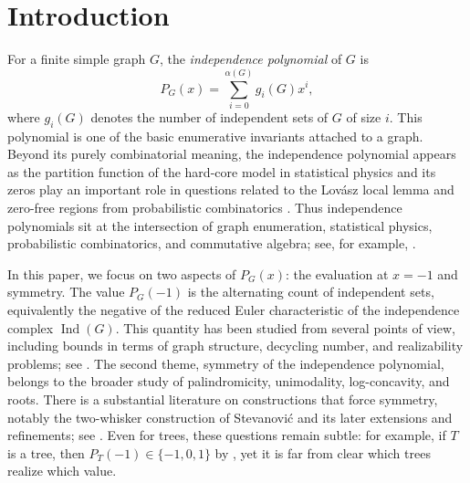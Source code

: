 \documentclass[12pt]{amsart}
\theoremstyle{plain}
\theoremstyle{definition}
\DeclareMathOperator{\Ind}{Ind}
\begin{document}
\maketitle




\section*{Introduction}

For a finite simple graph \(G\), the \emph{independence polynomial} of \(G\) is
\[
P_G(x)=\sum_{i=0}^{\alpha(G)} g_i(G)x^i,
\]
where \(g_i(G)\) denotes the number of independent sets of \(G\) of size \(i\).
This polynomial is one of the basic enumerative invariants attached to a graph.  Beyond its purely combinatorial meaning, the independence polynomial appears as the partition function of the hard-core model in statistical physics \cite{hardcore_model} and
its zeros play an important role in questions
related to the Lov\'asz local lemma and zero-free regions from probabilistic combinatorics \cite{ScottSokal2005}. Thus independence
polynomials sit at the intersection of graph enumeration, statistical physics,
probabilistic combinatorics, and commutative algebra; see, for example,
\cite{Survey_ind_poly,GutmanHarary,biermann2026,hibi2026pseudogorensteingraphs}.

In this paper, we focus on two aspects of \(P_G(x)\): the evaluation at \(x=-1\) and
symmetry.  The value  $P_G(-1)$
is the alternating count of independent sets, equivalently the negative of the reduced
Euler characteristic of the independence complex \(\Ind(G)\). This quantity has been
studied from several points of view, including bounds in terms of graph structure,
decycling number, and realizability problems; see
\cite{Upper_bound_engstrom,levit2009independence_preprint,Levit_Mandrescu,Bound_indp_poly_neg_1}. The second theme, symmetry of the independence polynomial, belongs to the broader study
of  palindromicity, unimodality, log-concavity, and roots. There is a substantial literature on constructions that force symmetry, notably the two-whisker
construction of Stevanović and its later extensions and refinements; see
\cite{Stevanovic,LevitMandrescuSymmetry,Mandrescu2012}. Even for trees, these questions
remain subtle: for example, if \(T\) is a tree, then \(P_T(-1)\in\{-1,0,1\}\) by
\cite{levit2009independence_preprint}, yet it is far from clear which trees realize
which value.
\end{document}
